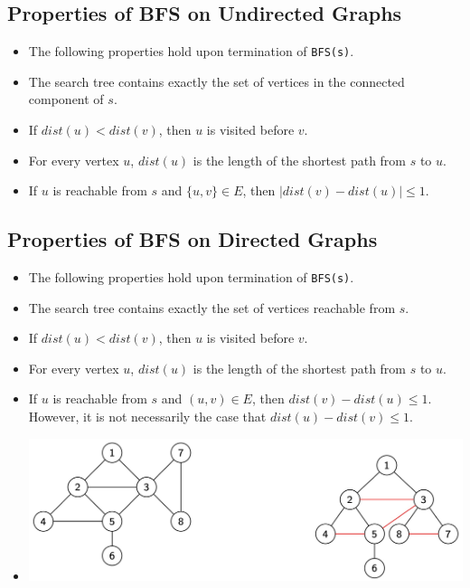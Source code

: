 \subsection{Properties of BFS on Undirected Graphs}
\begin{itemize}
    \item The following properties hold upon termination of \texttt{BFS(s)}.
    \item The search tree contains exactly the set of vertices in the connected component of $s$.
    \item If $dist(u) < dist(v)$, then $u$ is visited before $v$.
    \item For every vertex $u$, $dist(u)$ is the length of the shortest path from $s$ to $u$.
    \item If $u$ is reachable from $s$ and $\{ u, v \} \in E$, then $\left|dist(v) - dist(u)\right| \leq 1$.
\end{itemize}

\subsection{Properties of BFS on Directed Graphs}
\begin{itemize}
    \item The following properties hold upon termination of \texttt{BFS(s)}.
    \item The search tree contains exactly the set of vertices reachable from $s$.
    \item If $dist(u) < dist(v)$, then $u$ is visited before $v$.
    \item For every vertex $u$, $dist(u)$ is the length of the shortest path from $s$ to $u$.
    \item If $u$ is reachable from $s$ and $(u, v) \in E$, then $dist(v) - dist(u) \leq 1$. However, it is not necessarily the case that $dist(u) - dist(v) \leq 1$.
    \item[] \includegraphics[width=\textwidth]{lecture18/images/bfs-undirected--layers-example.jpg}
\end{itemize}

